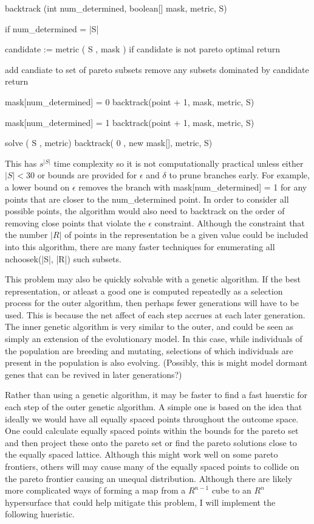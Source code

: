 \documentclass{article}
\begin{document}
{{backtrack (int num_determined, boolean[] mask, metric, S)
{
	if num_determined = |S|
	{
		candidate := metric ( S , mask )
		if candidate is not pareto optimal
		{
		  return
		}
		
		add candiate to set of pareto subsets
		remove any subsets dominated by candidate
		return
	}
	
	mask[num_determined] = 0
	backtrack(point + 1, mask, metric, S)
	
	mask[num_determined] = 1
	backtrack(point + 1, mask, metric, S)
}

solve ( S , metric)
{
      backtrack( 0 , new mask[], metric, S)
}


This has $s^{|S|}$ time complexity so it is not computationally practical unless either $|S| < 30$ or bounds are provided for $\epsilon$ and $\delta$ to prune branches early.
For example, a lower bound on $\epsilon$ removes the branch with mask[num_determined] = 1 for any points that are closer to the num_determined point.
In order to consider all possible points, the algorithm would also need to backtrack on the order of removing close points that violate the $\epsilon$ constraint.
Although the constraint that the number $|R|$ of points in the representation be a given value could be included into this algorithm, 
there are many faster techniques for enumerating all nchoosek(|S|, |R|) such subsets.

This problem may also be quickly solvable with a genetic algorithm.
If the best representation, or atleast a good one is computed repeatedly as a selection process for the outer algorithm, then perhaps fewer generations will have to be used.
This is because the net affect of each step accrues at each later generation.
The inner genetic algorithm is very similar to the outer, and could be seen as simply an extension of the evolutionary model.
In this case, while individuals of the population are breeding and mutating, selections of which individuals are present in the population is also evolving.
(Possibly, this is might model dormant genes that can be revived in later generations?)

Rather than using a genetic algorithm, it may be faster to find a fast huerstic for each step of the outer genetic algorithm.
A simple one is based on the idea that ideally we would have all equally spaced points throughout the outcome space.
One could calculate equally spaced points within the bounds for the pareto set and then project these onto the pareto set or find the pareto solutions close to the equally spaced lattice.
Although this might work well on some pareto frontiers, others will may cause many of the equally spaced points to collide on the pareto frontier causing an unequal distribution.
Although there are likely more complicated ways of forming a map from a $R^{n-1}$ cube to an $R^n$ hypersurface that could help mitigate this problem, I will implement the following hueristic.

}}
\end{document}
